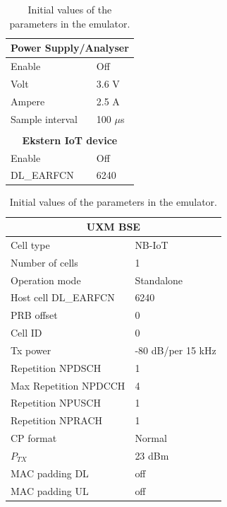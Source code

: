 \begin{table}[H]
\captionsetup{belowskip=0em}
\noindent
\centering
\begin{minipage}[t]{0.48\textwidth}
\begin{tabular}{|p{4cm}|p{2cm}|}
\hline
\multicolumn{2}{|c|}{\textbf{Power Supply/Analyser}}                         \\ \hline
Enable             & Off            \\ \hline
Volt               & 3.6 V          \\ \hline
Ampere             & 2.5 A          \\ \hline
Sample interval	   & 100 $\mu$s		\\ \hline
\multicolumn{2}{c}{}\\ \hline
\multicolumn{2}{|c|}{\textbf{Ekstern IoT device}}                            \\ \hline
Enable             & Off            \\ \hline
DL\_EARFCN         & 6240           \\ \hline
\end{tabular}
\end{minipage}%
\hfill
\begin{minipage}[t]{0.48\textwidth}
\begin{tabular}{|p{4cm}|p{2cm}|} \hline
\multicolumn{2}{|c|}{\textbf{UXM \gls{BSE}}} \\ \hline
Cell type			 & NB-IoT         \\ \hline
Number of cells		 & 1              \\ \hline
Operation mode		 & Standalone     \\ \hline
Host cell DL\_EARFCN & 6240           \\ \hline
PRB offset			 & 0	          \\ \hline
Cell ID				 & 0              \\ \hline
Tx power			 & -80 dB/per 15 kHz \\ \hline
Repetition NPDSCH	 & 1	          \\ \hline
Max Repetition NPDCCH & 4	          \\ \hline
Repetition NPUSCH	 & 1	          \\ \hline
Repetition NPRACH	 & 1	          \\ \hline
CP format			 & Normal         \\ \hline
$P_{TX}$				 & 23 dBm         \\ \hline
MAC padding DL		 & off       	  \\ \hline
MAC padding UL		 & off       	  \\ \hline
\end{tabular}
\end{minipage}
\caption{Initial values of the parameters in the emulator.}
\label{tab:setup_parameters}
\end{table}



